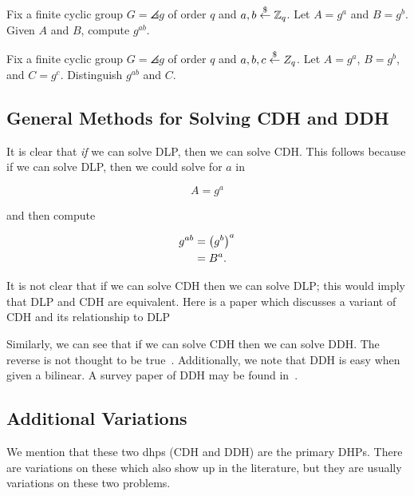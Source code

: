 \begin{defn}
Fix a \gls{finite cyclic group} $G = \angles{g}$ of order $q$
and $a,b\stackrel{\$}{\leftarrow}{}\mathbb{Z}_{q}$.
Let $A = g^{a}$ and $B = g^{b}$.
Given $A$ and $B$, compute $g^{ab}$.
\end{defn}

\begin{defn}
Fix a \gls{finite cyclic group} $G = \angles{g}$ of order $q$
and $a,b,c\stackrel{\$}{\leftarrow}{}Z_{q}$.
Let $A = g^{a}$, $B = g^{b}$, and $C = g^{c}$.
Distinguish $g^{ab}$ and $C$.
\end{defn}

\subsection{General Methods for Solving CDH and DDH}

It is clear that \emph{if} we can solve DLP, then we can solve CDH.
This follows because if we can solve DLP, then we could solve for $a$ in

\begin{equation}
    A = g^{a}
\end{equation}

\noindent
and then compute

\begin{align}
    g^{ab} &= \left( g^{b} \right)^{a} \nonumber\\
        &= B^{a}.
\end{align}

\noindent
It is not clear that if we can solve CDH then we can solve DLP;
this would imply that DLP and CDH are equivalent.
Here is a paper which discusses a variant of
CDH and its relationship to DLP~\cite{cryptoeprint:2004:306}

Similarly, we can see that if we can solve CDH then we can solve DDH.
The reverse is not thought
to be true~\cite[Pages 340--1]{IntroModernCrypto}.
Additionally, we note that DDH is easy when given a \gls{bilinear}.
A survey paper of DDH may be found in~\cite{boneh1998decision}.

\subsection{Additional Variations}

We mention that these two \glspl{dhp} (CDH and DDH)
are the primary DHPs.
There are variations on these which also show up in the literature,
but they are usually variations on these two problems.
